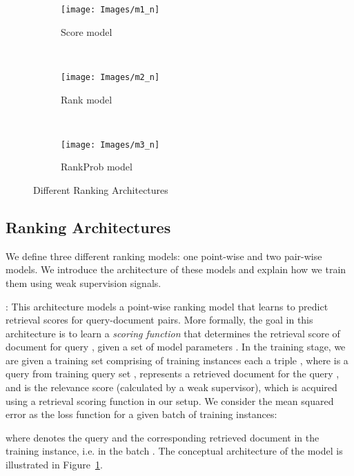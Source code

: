 \documentclass[sigconf]{acmart}
\newcommand{\Modelone}{Score model\xspace}
\newcommand{\mone}{Score\xspace}
\newcommand{\mtwo}{Rank\xspace}
\newcommand{\mthree}{RankProb\xspace}
\newcommand{\sshrink}{\vspace{-.80ex}}
\begin{document}
\label{sec:models}
\begin{figure}[t]
    \centering
    \begin{subfigure}[t]{0.23\columnwidth}
        \centering
        \texttt{[image: Images/m1\_n]}\vspace*{-3ex}\caption{\label{fig:m1}\mone model}
    \end{subfigure}~
    \begin{subfigure}[t]{0.40\columnwidth}
        \centering
        \texttt{[image: Images/m2\_n]}\vspace*{-3ex}\caption{\label{fig:m2}\mtwo model}
    \end{subfigure}~
    \begin{subfigure}[t]{0.37\columnwidth}
        \centering
        \texttt{[image: Images/m3\_n]}\vspace*{-3ex}\caption{\label{fig:m3}\mthree model}
    \end{subfigure}\vspace*{-2ex}\caption{\label{fig:ranking-arch} Different Ranking Architectures}
    \vspace{-20pt}
\end{figure}
\sshrink
\subsection{Ranking Architectures}
We define three different ranking models: 
one point-wise and two pair-wise models. 
We introduce the architecture of these models and explain how we train them using weak supervision signals.

\mypar{\Modelone}: This architecture models a point-wise ranking model that learns to predict retrieval scores for query-document pairs. More formally, the goal in this architecture is to learn a \emph{scoring function}  that determines the retrieval score of document  for query , given a set of model parameters .
In the training stage, we are given a training set comprising of training instances each a triple , where  is a query from training query set ,  represents a retrieved document for the query , and  is the relevance score (calculated by a weak supervisor), which is acquired using a retrieval scoring function in our setup.
We consider the mean squared error as the loss function for a given batch of training instances:

where  denotes the query and the corresponding retrieved document in the  training instance, i.e.  in the batch .
The conceptual architecture of the model is illustrated in Figure~\ref{fig:m1}.
\end{document}
